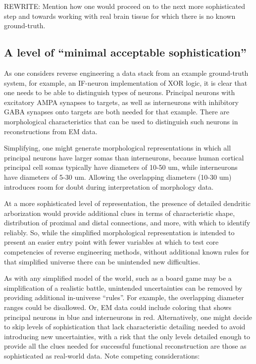 \documentclass{ldr-article}
\begin{document}
\alert{REWRITE:} Mention how one would proceed on to the next more sophisticated step and towards working with real brain tissue for which there is no known ground-truth.

\subsection{A level of ``minimal acceptable sophistication''}

As one considers reverse engineering a data stack from an example ground-truth system, for example, an IF-neuron implementation of XOR logic, it is clear that one needs to be able to distinguish types of neurons. Principal neurons with excitatory AMPA synapses to targets, as well as interneurons with inhibitory GABA synapses onto targets are both needed for that example. There are morphological characteristics that can be used to distinguish such neurons in reconstructions from EM data.

Simplifying, one might generate morphological representations in which all principal neurons have larger somas than interneurons, because human cortical principal cell somas typically have diameters of 10-50 um, while interneurons have diameters of 5-30 um. Allowing the overlapping diameters (10-30 um) introduces room for doubt during interpretation of morphology data.

At a more sophisticated level of representation, the presence of detailed dendritic arborization would provide additional clues in terms of characteristic shape, distribution of proximal and distal connections, and more, with which to identify reliably. So, while the simplified morphological representation is intended to present an easier entry point with fewer variables at which to test core competencies of reverse engineering methods, without additional known rules for that simplified universe there can be unintended new difficulties.

As with any simplified model of the world, such as a board game may be a simplification of a realistic battle, unintended uncertainties can be removed by providing additional in-universe ``rules''. For example, the overlapping diameter ranges could be disallowed. Or, EM data could include coloring that shows principal neurons in blue and interneurons in red. Alternatively, one might decide to skip levels of sophistication that lack characteristic detailing needed to avoid introducing new uncertainties, with a risk that the only levels detailed enough to provide all the clues needed for successful functional reconstruction are those as sophisticated as real-world data. Note competing considerations:
\end{document}
